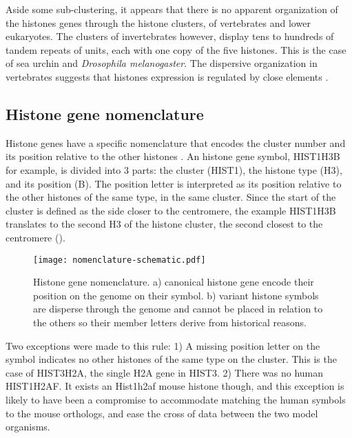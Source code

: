     Aside some sub-clustering, it appears that
    there is no apparent organization
    of the histones genes through the histone clusters, of vertebrates and
    lower eukaryotes. The clusters of invertebrates however, display tens to hundreds
    of tandem repeats of units, each with one copy of the five histones. This is the
    case of sea urchin and \textit{Drosophila melanogaster}. The dispersive organization
    in vertebrates suggests that histones expression is regulated by close elements
    \citep{close-regulators}.

  \subsection{Histone gene nomenclature}
    Histone genes have a specific nomenclature that encodes the cluster number and its
    position relative to the other histones \citep{Marzluff02}. An histone gene
    symbol, HIST1H3B for example, is divided into 3 parts: the cluster (HIST1),
    the histone type (H3), and its position (B). The position letter is interpreted as
    its position relative to the other histones of the same type, in the same cluster.
    Since the start of the cluster is defined as the side closer to the centromere, the
    example HIST1H3B translates to the second H3 of the histone cluster, the
    second closest to the centromere ().

    \begin{figure*}
      \centering
      \texttt{[image: nomenclature-schematic.pdf]}
      \caption{Histone gene nomenclature. a) canonical histone gene encode their position
               on the genome on their symbol. b) variant histone symbols are disperse through
               the genome and cannot be placed in relation to the others so their member
               letters derive from historical reasons.}
      \label{fig:nomenclature}
    \end{figure*}

    Two exceptions were made to this rule: 1) A missing position letter on the symbol indicates
    no other histones of the same type on the cluster. This is the case of HIST3H2A, the
    single H2A gene in HIST3. 2) There was no human HIST1H2AF. It exists an Hist1h2af mouse
    histone though, and this exception is likely to have been a compromise to accommodate
    matching the human symbols to the mouse orthologs, and ease the cross of data between the
    two model organisms.


